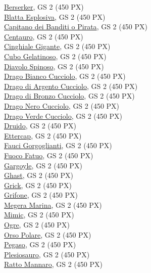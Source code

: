 \begin{multicols}{3}
{\hyperlink{Berserker}{Berserker}, GS 2 (450 PX)\\
\hyperlink{Blatta Esplosiva}{Blatta Esplosiva}, GS 2 (450 PX)\\
\hyperlink{Capitano dei Banditi o Pirata}{Capitano dei Banditi o Pirata}, GS 2 (450 PX)\\
\hyperlink{Centauro}{Centauro}, GS 2 (450 PX)\\
\hyperlink{Cinghiale Gigante}{Cinghiale Gigante}, GS 2 (450 PX)\\
\hyperlink{Cubo Gelatinoso}{Cubo Gelatinoso}, GS 2 (450 PX)\\
\hyperlink{Diavolo Spinoso}{Diavolo Spinoso}, GS 2 (450 PX)\\
\hyperlink{Drago Bianco Cucciolo}{Drago Bianco Cucciolo}, GS 2 (450 PX)\\
\hyperlink{Drago di Argento Cucciolo}{Drago di Argento Cucciolo}, GS 2 (450 PX)\\
\hyperlink{Drago di Bronzo Cucciolo}{Drago di Bronzo Cucciolo}, GS 2 (450 PX)\\
\hyperlink{Drago Nero Cucciolo}{Drago Nero Cucciolo}, GS 2 (450 PX)\\
\hyperlink{Drago Verde Cucciolo}{Drago Verde Cucciolo}, GS 2 (450 PX)\\
\hyperlink{Druido}{Druido}, GS 2 (450 PX)\\
\hyperlink{Ettercap}{Ettercap}, GS 2 (450 PX)\\
\hyperlink{Fauci Gorgoglianti}{Fauci Gorgoglianti}, GS 2 (450 PX)\\
\hyperlink{Fuoco Fatuo}{Fuoco Fatuo}, GS 2 (450 PX)\\
\hyperlink{Gargoyle}{Gargoyle}, GS 2 (450 PX)\\
\hyperlink{Ghast}{Ghast}, GS 2 (450 PX)\\
\hyperlink{Grick}{Grick}, GS 2 (450 PX)\\
\hyperlink{Grifone}{Grifone}, GS 2 (450 PX)\\
\hyperlink{Megera Marina}{Megera Marina}, GS 2 (450 PX)\\
\hyperlink{Mimic}{Mimic}, GS 2 (450 PX)\\
\hyperlink{Ogre}{Ogre}, GS 2 (450 PX)\\
\hyperlink{Orso Polare}{Orso Polare}, GS 2 (450 PX)\\
\hyperlink{Pegaso}{Pegaso}, GS 2 (450 PX)\\
\hyperlink{Plesiosauro}{Plesiosauro}, GS 2 (450 PX)\\
\hyperlink{Ratto Mannaro}{Ratto Mannaro}, GS 2 (450 PX)\\
}
\end{multicols}
